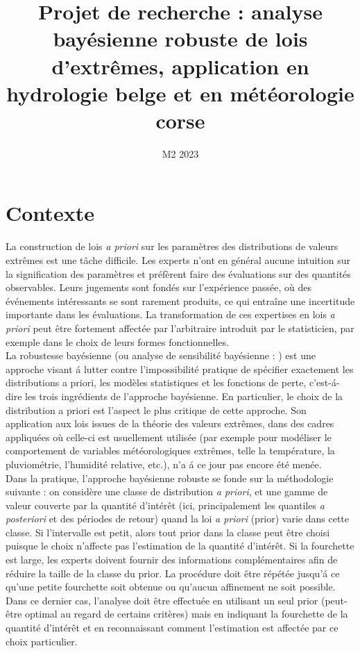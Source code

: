 \documentclass[10pt]{article}
\title{Projet de recherche : analyse bay\'esienne robuste de lois d'extr\^emes, application en hydrologie belge et en m\'et\'eorologie corse}
\date{M2 2023}
\newcommand{\1}{\mathbbm{1}}
\begin{document}
\maketitle

 

\section{Contexte}

La construction de lois {\it a priori} sur les param\`etres des distributions de valeurs extr\^emes est une t\^ache difficile. Les experts n'ont en g\'en\'eral aucune intuition sur la signification des param\`etres et pr\'ef\`erent faire des \'evaluations sur des quantit\'es observables. Leurs jugements sont fond\'es sur l'exp\'erience pass\'ee, o\`u des \'ev\'enements int\'eressants se sont rarement produits, ce qui entraîne une incertitude importante dans les \'evaluations. La transformation de ces expertises en lois {\it a priori} peut \^etre fortement affect\'ee par l'arbitraire introduit par le statisticien, par exemple dans le choix de leurs formes fonctionnelles. \\

La robustesse bay\'esienne (ou analyse de sensibilit\'e bay\'esienne : \cite{Rios1995,Rios2000}) est une approche visant \'a lutter contre l'impossibilit\'e pratique de sp\'ecifier exactement les distributions a priori, les mod\`eles statistiques et les fonctions de perte, c'est-\'a-dire les trois ingr\'edients de l'approche bay\'esienne. En particulier, le choix de la distribution a priori est l'aspect le plus critique de cette approche. Son application aux lois issues de la th\'eorie des valeurs extr\^emes, dans des cadres appliqu\'ees o\`u celle-ci est usuellement utilis\'ee (par exemple pour mod\'eliser le comportement de variables m\'et\'eorologiques extr\^emes, telle la temp\'erature, la pluviom\'etrie, l'humidit\'e relative, etc.), n'a \'a ce jour pas encore \'et\'e men\'ee. \\

Dans la pratique, l'approche bay\'esienne robuste se fonde sur la m\'ethodologie suivante : on consid\`ere  une classe de distribution {\it a priori}, et une gamme de valeur couverte par la quantit\'e d'int\'er\^et (ici, principalement les quantiles {\it a posteriori} et des p\'eriodes de retour) quand la loi {\it a priori} (prior) varie dans cette classe.  Si l'intervalle est petit, alors tout prior dans la classe peut \^etre choisi puisque le choix n'affecte pas l'estimation de la quantit\'e d'int\'er\^et. Si la fourchette est large, les experts doivent fournir des informations compl\'ementaires afin de r\'eduire la taille de la classe du prior. La proc\'edure doit \^etre r\'ep\'et\'ee jusqu'\'a ce qu'une petite fourchette soit obtenue ou qu'aucun affinement ne soit possible. Dans ce dernier cas, l'analyse doit \^etre effectu\'ee en utilisant un seul prior (peut-\^etre optimal au regard de certains crit\`eres) mais en indiquant la fourchette de la quantit\'e d'int\'er\^et et en reconnaissant comment l'estimation est affect\'ee par ce choix particulier. \\
\end{document}
